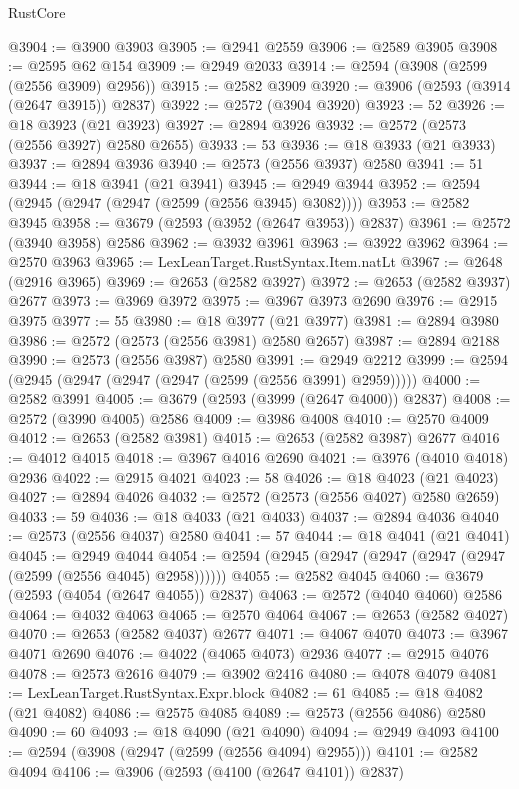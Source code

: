 \begin{lexlean}{RustCore}
\begin{coremodule}
@3904 := @3900 @3903
@3905 := @2941 @2559
@3906 := @2589 @3905
@3908 := @2595 @62 @154
@3909 := @2949 @2033
@3914 := @2594 (@3908 (@2599 (@2556 @3909) @2956))
@3915 := @2582 @3909
@3920 := @3906 (@2593 (@3914 (@2647 @3915)) @2837)
@3922 := @2572 (@3904 @3920)
@3923 := 52
@3926 := @18 @3923 (@21 @3923)
@3927 := @2894 @3926
@3932 := @2572 (@2573 (@2556 @3927) @2580 @2655)
@3933 := 53
@3936 := @18 @3933 (@21 @3933)
@3937 := @2894 @3936
@3940 := @2573 (@2556 @3937) @2580
@3941 := 51
@3944 := @18 @3941 (@21 @3941)
@3945 := @2949 @3944
@3952 := @2594 (@2945 (@2947 (@2947 (@2599 (@2556 @3945) @3082))))
@3953 := @2582 @3945
@3958 := @3679 (@2593 (@3952 (@2647 @3953)) @2837)
@3961 := @2572 (@3940 @3958) @2586
@3962 := @3932 @3961
@3963 := @3922 @3962
@3964 := @2570 @3963
@3965 := LexLeanTarget.RustSyntax.Item.natLt
@3967 := @2648 (@2916 @3965)
@3969 := @2653 (@2582 @3927)
@3972 := @2653 (@2582 @3937) @2677
@3973 := @3969 @3972
@3975 := @3967 @3973 @2690
@3976 := @2915 @3975
@3977 := 55
@3980 := @18 @3977 (@21 @3977)
@3981 := @2894 @3980
@3986 := @2572 (@2573 (@2556 @3981) @2580 @2657)
@3987 := @2894 @2188
@3990 := @2573 (@2556 @3987) @2580
@3991 := @2949 @2212
@3999 := @2594 (@2945 (@2947 (@2947 (@2947 (@2599 (@2556 @3991) @2959)))))
@4000 := @2582 @3991
@4005 := @3679 (@2593 (@3999 (@2647 @4000)) @2837)
@4008 := @2572 (@3990 @4005) @2586
@4009 := @3986 @4008
@4010 := @2570 @4009
@4012 := @2653 (@2582 @3981)
@4015 := @2653 (@2582 @3987) @2677
@4016 := @4012 @4015
@4018 := @3967 @4016 @2690
@4021 := @3976 (@4010 @4018) @2936
@4022 := @2915 @4021
@4023 := 58
@4026 := @18 @4023 (@21 @4023)
@4027 := @2894 @4026
@4032 := @2572 (@2573 (@2556 @4027) @2580 @2659)
@4033 := 59
@4036 := @18 @4033 (@21 @4033)
@4037 := @2894 @4036
@4040 := @2573 (@2556 @4037) @2580
@4041 := 57
@4044 := @18 @4041 (@21 @4041)
@4045 := @2949 @4044
@4054 := @2594 (@2945 (@2947 (@2947 (@2947 (@2947 (@2599 (@2556 @4045) @2958))))))
@4055 := @2582 @4045
@4060 := @3679 (@2593 (@4054 (@2647 @4055)) @2837)
@4063 := @2572 (@4040 @4060) @2586
@4064 := @4032 @4063
@4065 := @2570 @4064
@4067 := @2653 (@2582 @4027)
@4070 := @2653 (@2582 @4037) @2677
@4071 := @4067 @4070
@4073 := @3967 @4071 @2690
@4076 := @4022 (@4065 @4073) @2936
@4077 := @2915 @4076
@4078 := @2573 @2616
@4079 := @3902 @2416
@4080 := @4078 @4079
@4081 := LexLeanTarget.RustSyntax.Expr.block
@4082 := 61
@4085 := @18 @4082 (@21 @4082)
@4086 := @2575 @4085
@4089 := @2573 (@2556 @4086) @2580
@4090 := 60
@4093 := @18 @4090 (@21 @4090)
@4094 := @2949 @4093
@4100 := @2594 (@3908 (@2947 (@2599 (@2556 @4094) @2955)))
@4101 := @2582 @4094
@4106 := @3906 (@2593 (@4100 (@2647 @4101)) @2837)

\end{coremodule}
\end{lexlean}
